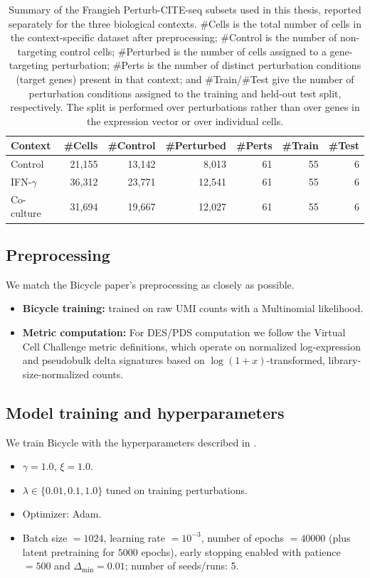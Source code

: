 \documentclass[12pt]{article}
\begin{document}
\begin{table}[H]
\centering
\caption{Summary of the Frangieh Perturb-CITE-seq subsets used in this thesis, reported separately for the three biological contexts. \#Cells is the total number of cells in the context-specific dataset after preprocessing; \#Control is the number of non-targeting control cells; \#Perturbed is the number of cells assigned to a gene-targeting perturbation; \#Perts is the number of distinct perturbation conditions (target genes) present in that context; and \#Train/\#Test give the number of perturbation conditions assigned to the training and held-out test split, respectively. The split is performed over perturbations rather than over genes in the expression vector or over individual cells.}
\label{tab:dataset-stats}
\begin{tabular}{lrrrrrr}
\toprule
Context & \#Cells & \#Control & \#Perturbed & \#Perts & \#Train & \#Test \\
\midrule
Control & 21{,}155 & 13{,}142 & 8{,}013  & 61 & 55 & 6 \\
IFN-$\gamma$ & 36{,}312 & 23{,}771 & 12{,}541 & 61 & 55 & 6 \\
Co-culture & 31{,}694 & 19{,}667 & 12{,}027 & 61 & 55 & 6 \\
\bottomrule
\end{tabular}
\end{table}

\subsection{Preprocessing}
We match the Bicycle paper’s preprocessing as closely as possible.
\begin{itemize}
    \item \textbf{Bicycle training:} trained on raw UMI counts with a Multinomial likelihood.
    \item \textbf{Metric computation:} For DES/PDS computation we follow the Virtual Cell Challenge metric definitions, which operate on normalized log-expression and pseudobulk delta signatures based on \(\log(1+x)\)-transformed, library-size-normalized counts.
\end{itemize}

\subsection{Model training and hyperparameters}
We train Bicycle with the hyperparameters described in \cite{rohbeck2024bicycle}.
\begin{itemize}
    \item \(\gamma = 1.0\), \(\xi = 1.0\).
    \item \(\lambda \in \{0.01, 0.1, 1.0\}\) tuned on training perturbations.
    \item Optimizer: Adam.
    \item Batch size \(=1024\), learning rate \(=10^{-3}\), number of epochs \(=40000\) (plus latent pretraining for \(5000\) epochs), early stopping enabled with patience \(=500\) and \(\Delta_{\min}=0.01\); number of seeds/runs: 5.
\end{itemize}
\end{document}
